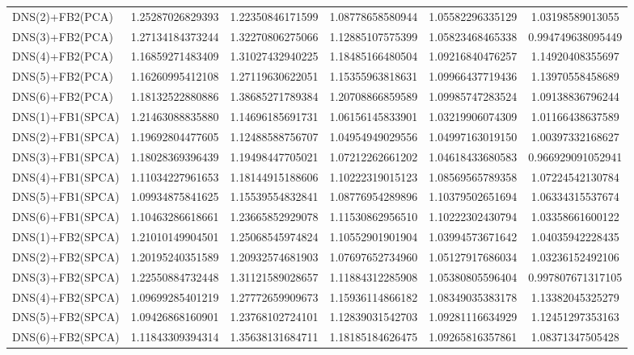 \begin{table}[h]
\begin{adjustbox}{totalheight=\baselineskip}
\begin{tabular}{lSSSSS}
DNS(2)+FB2(PCA) & 1.25287026829393 & 1.22350846171599 & 1.08778658580944 & 1.05582296335129 & 1.03198589013055 \\ 
DNS(3)+FB2(PCA) & 1.27134184373244 & 1.32270806275066 & 1.12885107575399 & 1.05823468465338 & 0.994749638095449 \\ 
DNS(4)+FB2(PCA) & 1.16859271483409 & 1.31027432940225 & 1.18485166480504 & 1.09216840476257 & 1.14920408355697 \\ 
DNS(5)+FB2(PCA) & 1.16260995412108 & 1.27119630622051 & 1.15355963818631 & 1.09966437719436 & 1.13970558458689 \\ 
DNS(6)+FB2(PCA) & 1.18132522880886 & 1.38685271789384 & 1.20708866859589 & 1.09985747283524 & 1.09138836796244 \\ 
DNS(1)+FB1(SPCA) & 1.21463088835880 & 1.14696185691731 & 1.06156145833901 & 1.03219906074309 & 1.01166438637589 \\ 
DNS(2)+FB1(SPCA) & 1.19692804477605 & 1.12488588756707 & 1.04954949029556 & 1.04997163019150 & 1.00397332168627 \\ 
DNS(3)+FB1(SPCA) & 1.18028369396439 & 1.19498447705021 & 1.07212262661202 & 1.04618433680583 & 0.966929091052941 \\ 
DNS(4)+FB1(SPCA) & 1.11034227961653 & 1.18144915188606 & 1.10222319015123 & 1.08569565789358 & 1.07224542130784 \\ 
DNS(5)+FB1(SPCA) & 1.09934875841625 & 1.15539554832841 & 1.08776954289896 & 1.10379502651694 & 1.06334315537674 \\ 
DNS(6)+FB1(SPCA) & 1.10463286618661 & 1.23665852929078 & 1.11530862956510 & 1.10222302430794 & 1.03358661600122 \\ 
DNS(1)+FB2(SPCA) & 1.21010149904501 & 1.25068545974824 & 1.10552901901904 & 1.03994573671642 & 1.04035942228435 \\ 
DNS(2)+FB2(SPCA) & 1.20195240351589 & 1.20932574681903 & 1.07697652734960 & 1.05127917686034 & 1.03236152492106 \\ 
DNS(3)+FB2(SPCA) & 1.22550884732448 & 1.31121589028657 & 1.11884312285908 & 1.05380805596404 & 0.997807671317105 \\ 
DNS(4)+FB2(SPCA) & 1.09699285401219 & 1.27772659909673 & 1.15936114866182 & 1.08349035383178 & 1.13382045325279 \\ 
DNS(5)+FB2(SPCA) & 1.09426868160901 & 1.23768102724101 & 1.12839031542703 & 1.09281116634929 & 1.12451297353163 \\ 
DNS(6)+FB2(SPCA) & 1.11843309394314 & 1.35638131684711 & 1.18185184626475 & 1.09265816357861 & 1.08371347505428 \\ 

\end{tabular}
\end{adjustbox}
\end{table}
